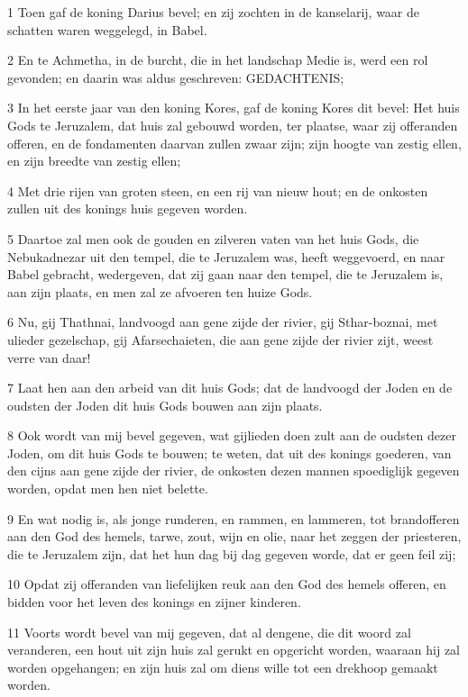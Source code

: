 \par 1 Toen gaf de koning Darius bevel; en zij zochten in de kanselarij, waar de schatten waren weggelegd, in Babel.
\par 2 En te Achmetha, in de burcht, die in het landschap Medie is, werd een rol gevonden; en daarin was aldus geschreven: GEDACHTENIS;
\par 3 In het eerste jaar van den koning Kores, gaf de koning Kores dit bevel: Het huis Gods te Jeruzalem, dat huis zal gebouwd worden, ter plaatse, waar zij offeranden offeren, en de fondamenten daarvan zullen zwaar zijn; zijn hoogte van zestig ellen, en zijn breedte van zestig ellen;
\par 4 Met drie rijen van groten steen, en een rij van nieuw hout; en de onkosten zullen uit des konings huis gegeven worden.
\par 5 Daartoe zal men ook de gouden en zilveren vaten van het huis Gods, die Nebukadnezar uit den tempel, die te Jeruzalem was, heeft weggevoerd, en naar Babel gebracht, wedergeven, dat zij gaan naar den tempel, die te Jeruzalem is, aan zijn plaats, en men zal ze afvoeren ten huize Gods.
\par 6 Nu, gij Thathnai, landvoogd aan gene zijde der rivier, gij Sthar-boznai, met ulieder gezelschap, gij Afarsechaieten, die aan gene zijde der rivier zijt, weest verre van daar!
\par 7 Laat hen aan den arbeid van dit huis Gods; dat de landvoogd der Joden en de oudsten der Joden dit huis Gods bouwen aan zijn plaats.
\par 8 Ook wordt van mij bevel gegeven, wat gijlieden doen zult aan de oudsten dezer Joden, om dit huis Gods te bouwen; te weten, dat uit des konings goederen, van den cijns aan gene zijde der rivier, de onkosten dezen mannen spoediglijk gegeven worden, opdat men hen niet belette.
\par 9 En wat nodig is, als jonge runderen, en rammen, en lammeren, tot brandofferen aan den God des hemels, tarwe, zout, wijn en olie, naar het zeggen der priesteren, die te Jeruzalem zijn, dat het hun dag bij dag gegeven worde, dat er geen feil zij;
\par 10 Opdat zij offeranden van liefelijken reuk aan den God des hemels offeren, en bidden voor het leven des konings en zijner kinderen.
\par 11 Voorts wordt bevel van mij gegeven, dat al dengene, die dit woord zal veranderen, een hout uit zijn huis zal gerukt en opgericht worden, waaraan hij zal worden opgehangen; en zijn huis zal om diens wille tot een drekhoop gemaakt worden.
